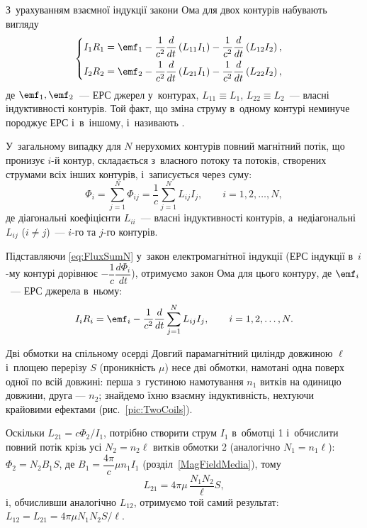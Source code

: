 З~урахуванням взаємної індукції закони Ома для двох контурів набувають вигляду
\begin{equation}\label{eq:MutualOhm}
	\begin{cases}
		I_1R_1 = \emf_1 - \dfrac1{c^2}\dfrac{d}{dt}\left(L_{11}I_1\right)
		- \dfrac1{c^2}\dfrac{d}{dt}\left(L_{12}I_2\right), \\[1.5ex]
		I_2R_2 = \emf_2 - \dfrac1{c^2}\dfrac{d}{dt}\left(L_{21}I_1\right)
		- \dfrac1{c^2}\dfrac{d}{dt}\left(L_{22}I_2\right),
	\end{cases}
\end{equation}
де $\emf_1,\emf_2$~--- ЕРС джерел у~контурах, $L_{11}\equiv L_1$, $L_{22}\equiv L_2$~--- власні індуктивності контурів. Той факт, що
зміна струму в~одному контурі неминуче породжує ЕРС і~в~іншому, і~називають .

У~загальному випадку для \(N\) нерухомих контурів повний магнітний потік, що пронизує
\(i\)-й контур, складається з~власного потоку та потоків, створених струмами всіх інших
контурів, і~записується через суму:
\begin{equation}\label{eq:FluxSumN}
	\Phi_i = \sum_{j=1}^{N} \Phi_{ij}
	= \frac1c \sum_{j=1}^{N} L_{ij} I_j,
	\qquad i = 1, 2, \dots, N,
\end{equation}
де діагональні коефіцієнти \(L_{ii}\)~--- власні індуктивності контурів, а~недіагональні
\(L_{ij}\) (\(i\neq j\))~---  \(i\)-го та
\(j\)-го контурів.

Підставляючи \eqref{eq:FluxSumN} у~закон електромагнітної індукції (ЕРС індукції в~\(i\)-му контурі дорівнює \(-\dfrac1c\dfrac{d\Phi_i}{dt}\)), отримуємо закон Ома для цього контуру, де \(\emf_i\)~--- ЕРС джерела в~ньому:
\begin{equation}\label{eq:OhmN}
	I_i R_i = \emf_i - \frac1{c^2}\frac{d}{dt}\sum_{j=1}^{N} L_{ij} I_j,
	\qquad i = 1, 2, \dots, N.
\end{equation}

\begin{Example}[unbreakable]{Дві обмотки на спільному осерді}
	Довгий парамагнітний циліндр довжиною $\ell$ і~площею перерізу $S$ (проникність $\mu$) несе дві обмотки, намотані одна поверх
	одної по всій довжині: перша
	з~густиною намотування $n_1$ витків на одиницю довжини, друга --- $n_2$; знайдемо їхню
	взаємну індуктивність, нехтуючи крайовими ефектами (рис.~\ref{pic:TwoCoils}).

	Оскільки $L_{21}=c\Phi_2/I_1$, потрібно створити струм $I_1$ в~обмотці 1 і~обчислити
	повний потік крізь усі $N_2 = n_2\ell$ витків обмотки 2 (аналогічно $N_1=n_1\ell$): $\Phi_2 = N_2 B_1 S$, де $B_1
	= \dfrac{4\pi}{c}\mu n_1 I_1$ (розділ~\ref{MagFieldMedia}), тому
	\begin{equation}\label{eq:MutualExample}
		L_{21} = 4\pi\mu\, \frac{N_1N_2}{\ell}S,
	\end{equation}
	і, обчисливши аналогічно $L_{12}$, отримуємо той самий результат:
	$L_{12}=L_{21}=4\pi\mu N_1N_2S/\ell$.
\end{Example}

